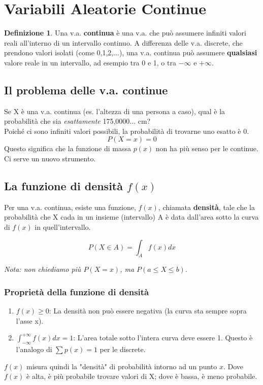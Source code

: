 \documentclass[a4paper, 11pt]{article}
\theoremstyle{definition}
\newtheorem{definizione}{Definizione}[section]
\begin{document}
\newpage

\section{Variabili Aleatorie Continue}
\begin{definizione}
Una v.a. \textbf{continua} è una v.a. che può assumere infiniti valori reali all'interno di un intervallo continuo. A differenza delle v.a. discrete, che prendono valori isolati (come 0,1,2,...), una v.a. continua può assumere \textbf{qualsiasi} valore reale in un intervallo, ad esempio tra 0 e 1, o tra $-\infty$ e $+\infty$.
\end{definizione}

\subsection*{Il problema delle v.a. continue}
Se X è una v.a. continua (es. l'altezza di una persona a caso), qual è la probabilità che sia \textit{esattamente} 175,0000... cm? \\
Poiché ci sono infiniti valori possibili, la probabilità di trovarne uno esatto è 0.
\[ P(X=x) = 0 \]
Questo significa che la funzione di massa $p(x)$ non ha più senso per le continue. Ci serve un nuovo strumento.

\subsection{La funzione di densità $f(x)$}
Per una v.a. continua, esiste una funzione, $f(x)$, chiamata \textbf{densità}, tale che la probabilità che X cada in un insieme (intervallo) A è data dall'area sotto la curva di $f(x)$ in quell'intervallo.
\begin{formulabox}
    \[ P(X \in A) = \int_A f(x)dx \]
\end{formulabox}
\textit{Nota: non chiediamo più $P(X=x)$, ma $P(a \le X \le b)$}.

\subsubsection*{Proprietà della funzione di densità}
\begin{enumerate}
    \item $f(x) \ge 0$: La densità non può essere negativa (la curva sta sempre sopra l'asse x).
    \item $\int_{-\infty}^{+\infty} f(x)dx = 1$: L'area totale sotto l'intera curva deve essere 1. Questo è l'analogo di $\sum p(x)=1$ per le discrete.
\end{enumerate}
$f(x)$ misura quindi la "densità" di probabilità intorno ad un punto $x$. Dove $f(x)$ è alta, è più probabile trovare valori di X; dove è bassa, è meno probabile.
\end{document}
